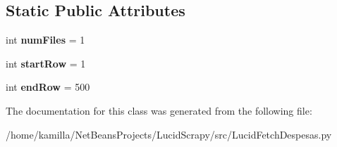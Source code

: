 \subsection*{Static Public Attributes}
\begin{DoxyCompactItemize}
\item 
\hypertarget{classLucidFetchDespesas_1_1LucidFetchDespesas_ae64548280cd4c305eedfad9ff7cf7b77}{
int {\bfseries numFiles} = 1}
\label{classLucidFetchDespesas_1_1LucidFetchDespesas_ae64548280cd4c305eedfad9ff7cf7b77}

\item 
\hypertarget{classLucidFetchDespesas_1_1LucidFetchDespesas_afff69bba583f76238aa1472a44f13bb1}{
int {\bfseries startRow} = 1}
\label{classLucidFetchDespesas_1_1LucidFetchDespesas_afff69bba583f76238aa1472a44f13bb1}

\item 
\hypertarget{classLucidFetchDespesas_1_1LucidFetchDespesas_a1b4d82e2a98307334081269d4b202e07}{
int {\bfseries endRow} = 500}
\label{classLucidFetchDespesas_1_1LucidFetchDespesas_a1b4d82e2a98307334081269d4b202e07}

\end{DoxyCompactItemize}


The documentation for this class was generated from the following file:\begin{DoxyCompactItemize}
\item 
/home/kamilla/NetBeansProjects/LucidScrapy/src/LucidFetchDespesas.py\end{DoxyCompactItemize}
